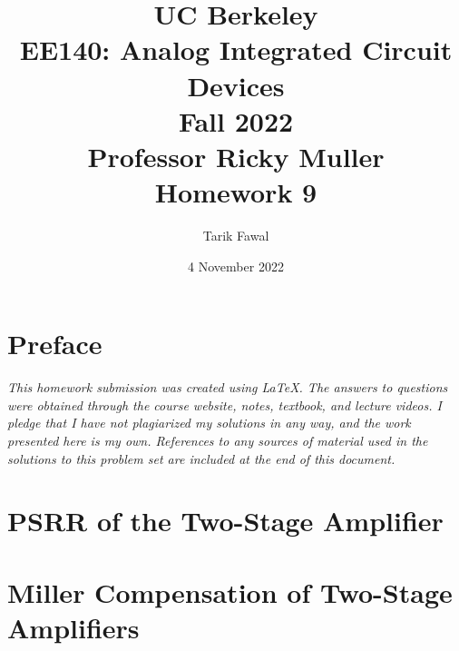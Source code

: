 \documentclass[12pt, fleqn]{article}
\title {
    \normalsize{UC Berkeley}\\
    \large{{EE140: Analog Integrated Circuit Devices\\Fall 2022\\Professor Ricky Muller\\}}
    \vspace{0.5ex}
    \Huge{Homework 9}
    \vspace{0.5ex}
}
\author{Tarik Fawal}
\date{4 November 2022}
\begin{document}
\maketitle
\tableofcontents
\flushbottom
    \section*{Preface}
        \textit{\emph{This homework submission was created using \LaTeX.  The answers to questions were obtained through the course website, notes, textbook, and lecture videos.  I pledge that I have not plagiarized my solutions in any way, and the work presented here is my own.  References to any sources of material used in the solutions to this problem set are included at the end of this document.}}
\newpage
\section{PSRR of the Two-Stage Amplifier}

\newpage
\section{Miller Compensation of Two-Stage Amplifiers}

\newpage
\end{document}
